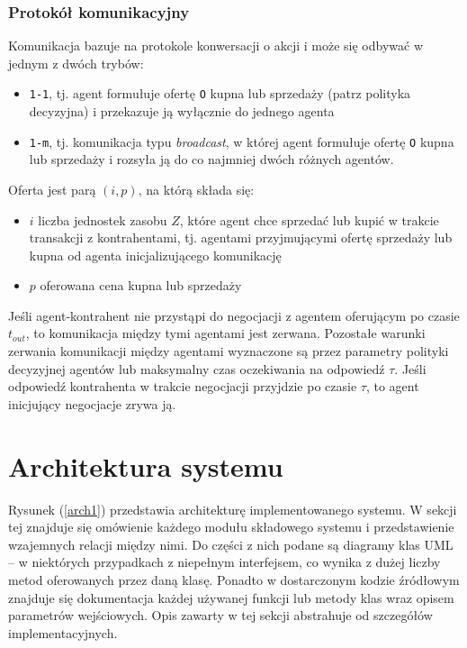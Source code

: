 \documentclass{article}
\providecommand{\tightlist}{%
  \setlength{\itemsep}{0pt}\setlength{\parskip}{0pt}}
\begin{document}
\subsubsection{Protokół komunikacyjny}

Komunikacja bazuje na protokole konwersacji o akcji i może się odbywać w jednym z dwóch trybów:

\begin{itemize}
\tightlist
\item
  \texttt{1-1}, tj. agent formułuje ofertę \texttt{O} kupna lub
  sprzedaży (patrz polityka decyzyjna) i przekazuje ją wyłącznie do
  jednego agenta
\item
  \texttt{1-m}, tj. komunikacja typu \emph{broadcast}, w której agent
  formułuje ofertę \texttt{O} kupna lub sprzedaży i rozsyła ją do co
  najmniej dwóch różnych agentów.
\end{itemize}

Oferta jest parą \((i, p)\), na którą składa się:

\begin{itemize}
\tightlist
\item
  \(i\) liczba jednostek zasobu \(Z\), które agent chce sprzedać lub
  kupić w trakcie transakcji z kontrahentami, tj. agentami przyjmującymi
  ofertę sprzedaży lub kupna od agenta inicjalizującego komunikację
\item
  \(p\) oferowana cena kupna lub sprzedaży
\end{itemize}

Jeśli agent-kontrahent nie przystąpi do negocjacji z agentem oferującym
po czasie \(t_{out}\), to komunikacja między tymi agentami jest zerwana.
Pozostałe warunki zerwania komunikacji między agentami wyznaczone są
przez parametry polityki decyzyjnej agentów lub maksymalny czas
oczekiwania na odpowiedź \(\tau\). Jeśli odpowiedź kontrahenta w trakcie
negocjacji przyjdzie po czasie \(\tau\), to agent inicjujący negocjacje
zrywa ją.

\newpage

\section{Architektura systemu \label{sec2}}

Rysunek (\ref{arch1}) przedstawia architekturę implementowanego systemu. W sekcji tej znajduje się 
omówienie każdego modułu składowego systemu i przedstawienie wzajemnych relacji między nimi.
Do części z nich podane są diagramy klas UML -- w niektórych przypadkach z niepełnym interfejsem,
co wynika z dużej liczby metod oferowanych przez daną klasę. Ponadto w dostarczonym kodzie źródłowym 
znajduje się dokumentacja każdej używanej funkcji lub metody klas wraz opisem parametrów wejściowych.
Opis zawarty w tej sekcji abstrahuje od szczegółów implementacyjnych.
\end{document}
